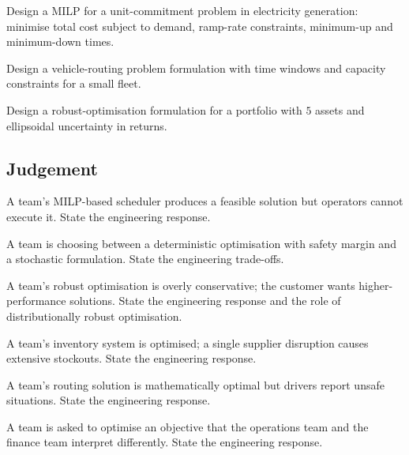 \begin{exercise}
Design a MILP for a unit-commitment problem in electricity generation: minimise total cost subject to demand, ramp-rate constraints, minimum-up and minimum-down times.
\end{exercise}

\begin{exercise}
Design a vehicle-routing problem formulation with time windows and capacity constraints for a small fleet.
\end{exercise}

\begin{exercise}
Design a robust-optimisation formulation for a portfolio with $5$ assets and ellipsoidal uncertainty in returns.
\end{exercise}

\subsection*{Judgement}

\begin{exercise}
A team's MILP-based scheduler produces a feasible solution but operators cannot execute it. State the engineering response.
\end{exercise}

\begin{exercise}
A team is choosing between a deterministic optimisation with safety margin and a stochastic formulation. State the engineering trade-offs.
\end{exercise}

\begin{exercise}
A team's robust optimisation is overly conservative; the customer wants higher-performance solutions. State the engineering response and the role of distributionally robust optimisation.
\end{exercise}

\begin{exercise}
A team's inventory system is optimised; a single supplier disruption causes extensive stockouts. State the engineering response.
\end{exercise}

\begin{exercise}
A team's routing solution is mathematically optimal but drivers report unsafe situations. State the engineering response.
\end{exercise}

\begin{exercise}
A team is asked to optimise an objective that the operations team and the finance team interpret differently. State the engineering response.
\end{exercise}

